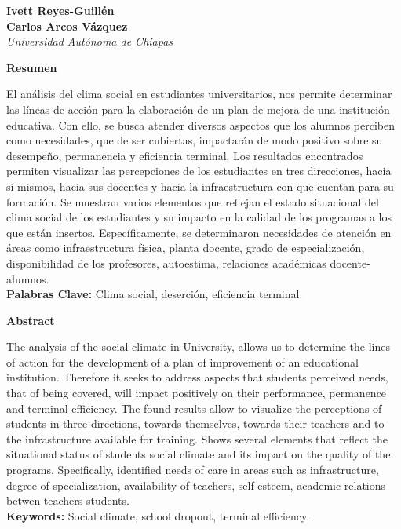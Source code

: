 
\thispagestyle{empty}	
{}
{}

\bigskip
\begin{center}
{\bfseries Ivett Reyes{-}Guillén\\
Carlos Arcos Vázquez}\\
{\itshape Universidad Autónoma de Chiapas}
\end{center}

\bigskip
\textbf{Resumen}

El análisis del clima social en estudiantes universitarios, nos permite
determinar las líneas de acción para la elaboración de un plan de mejora de
una institución educativa. Con ello, se busca atender diversos aspectos que
los alumnos perciben como necesidades, que de ser cubiertas, impactarán de
modo positivo sobre su desempeño, permanencia y eficiencia terminal. Los
resultados encontrados permiten visualizar las percepciones de los
estudiantes en tres direcciones, hacia sí mismos, hacia sus docentes y
hacia la infraestructura con que cuentan para su formación. Se muestran
varios elementos que reflejan el estado situacional del clima social de los
estudiantes y su impacto en la calidad de los programas a los que están
insertos. Específicamente, se determinaron necesidades de atención en áreas
como infraestructura física, planta docente, grado de especialización,
disponibilidad de los profesores, autoestima, relaciones académicas
docente-alumnos.\\
\textbf{Palabras Clave:} Clima social, deserción, eficiencia terminal.
\enlargethispage{1\baselineskip}

\medskip 
\textbf{Abstract}

The analysis of the social climate in University, allows us to determine the
lines of action for the development of a plan of improvement of an
educational institution. Therefore it seeks to address aspects that
students perceived needs, that of being covered, will impact positively on
their performance, permanence and terminal efficiency. The found results
allow to visualize the perceptions of students in three directions, towards
themselves, towards their teachers and to the infrastructure available for
training. Shows several elements that reflect the situational status of
students social climate and its impact on the quality of the programs.
Specifically, identified needs of care in areas such as infrastructure,
degree of specialization, availability of teachers, self-esteem, academic
relations betwen teachers-students.\\ 
\textbf{Keywords:} Social climate,  school dropout,
terminal efficiency.

